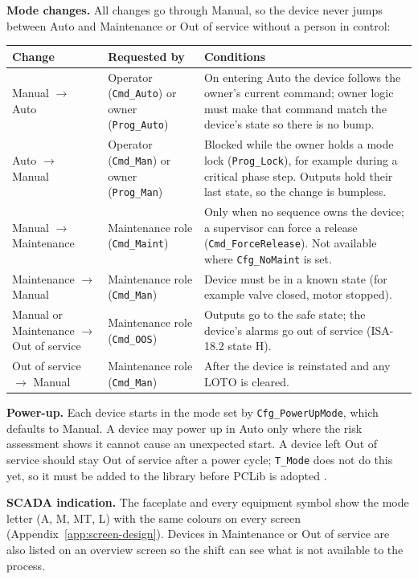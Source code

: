 \textbf{Mode changes.} All changes go through Manual, so the device never jumps between Auto and Maintenance or Out of service without a person in control:
\begin{longtable}{@{}P{3.60cm}P{4.80cm}P{8.11cm}@{}}
\toprule
{}\textbf{Change} & \textbf{Requested by} & \textbf{Conditions} \\
\midrule
\endhead
Manual $\rightarrow$ Auto & Operator (\texttt{Cmd\_Auto}) or owner (\texttt{Prog\_Auto}) & On entering Auto the device follows the owner's current command; owner logic must make that command match the device's state so there is no bump. \\
Auto $\rightarrow$ Manual & Operator (\texttt{Cmd\_Man}) or owner (\texttt{Prog\_Man}) & Blocked while the owner holds a mode lock (\texttt{Prog\_Lock}), for example during a critical phase step. Outputs hold their last state, so the change is bumpless. \\
Manual $\rightarrow$ Maintenance & Maintenance role (\texttt{Cmd\_Maint}) & Only when no sequence owns the device; a supervisor can force a release (\texttt{Cmd\_ForceRelease}). Not available where \texttt{Cfg\_NoMaint} is set. \\
Maintenance $\rightarrow$ Manual & Maintenance role (\texttt{Cmd\_Man}) & Device must be in a known state (for example valve closed, motor stopped). \\
Manual or Maintenance $\rightarrow$ Out of service & Maintenance role (\texttt{Cmd\_OOS}) & Outputs go to the safe state; the device's alarms go out of service (ISA-18.2 state H). \\
Out of service $\rightarrow$ Manual & Maintenance role (\texttt{Cmd\_Man}) & After the device is reinstated and any LOTO is cleared. \\
\bottomrule
\end{longtable}

\textbf{Power-up.} Each device starts in the mode set by \texttt{Cfg\_PowerUpMode}, which defaults to Manual. A device may power up in Auto only where the risk assessment shows it cannot cause an unexpected start. A device left Out of service should stay Out of service after a power cycle; \texttt{T\_Mode} does not do this yet, so it must be added to the library before PCLib is adopted \tbd.

\textbf{SCADA indication.} The faceplate and every equipment symbol show the mode letter (A, M, MT, L) with the same colours on every screen (Appendix~\ref{app:screen-design}). Devices in Maintenance or Out of service are also listed on an overview screen so the shift can see what is not available to the process.

